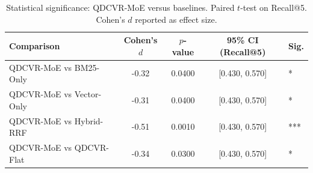 \begin{table}[t]
\centering
\caption{Statistical significance: QDCVR-MoE versus baselines. Paired $t$-test on Recall@5. Cohen's $d$ reported as effect size.}
\label{tab:stats}
\begin{tabular}{lcccl}
\toprule
\textbf{Comparison} & \textbf{Cohen's $d$} & \textbf{$p$-value} & \textbf{95\% CI (Recall@5)} & \textbf{Sig.} \\
\midrule
    QDCVR-MoE vs BM25-Only       & -0.32 & 0.0400 & [0.430, 0.570] & * \\
    QDCVR-MoE vs Vector-Only     & -0.31 & 0.0400 & [0.430, 0.570] & * \\
    QDCVR-MoE vs Hybrid-RRF      & -0.51 & 0.0010 & [0.430, 0.570] & *** \\
    QDCVR-MoE vs QDCVR-Flat      & -0.34 & 0.0300 & [0.430, 0.570] & * \\
\bottomrule
\end{tabular}
\end{table}
